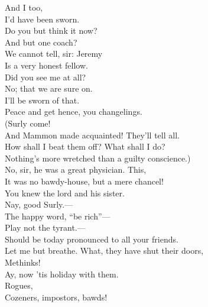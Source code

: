 \documentclass[a4paper,oneside,12pt]{memoir}
\begin{document}
\begin{drama*}
\neightwospeaks {} And I too,\\
I'd have been sworn.\\
\lovewitspeaks {} Do you but think it now?\\
And but one coach?\\
\neighthreespeaks {} We cannot tell, sir: Jeremy\\
Is a very honest fellow.\\
\facespeaks {} Did you see me at all?\\
\neighonespeaks No; that we are sure on.\\
\neightwospeaks {} I'll be sworn of that.\\
\lovewitspeaks Peace and get hence, you changelings.\\
\facespeaks {} (Surly come!\\
And Mammon made acquainted! They'll tell all.\\
How shall I beat them off? What shall I do?\\
Nothing's more wretched than a guilty conscience.)\\
\surlyspeaks No, sir, he was a great physician. This,\\
It was no bawdy-house, but a mere chancel!\\
You knew the lord and his sister.\\
\mammonspeaks {} Nay, good Surly.---\\
\surlyspeaks The happy word, ``be rich''---\\
\mammonspeaks {} Play not the tyrant.---\\
\surlyspeaks Should be today pronounced to all your friends.\\
\mammonspeaks Let me but breathe. What, they have shut their doors,\\
Methinks!\\
\surlyspeaks {} Ay, now 'tis holiday with them.\\
\mammonspeaks Rogues,\\
 Cozeners, impostors, bawds!\\

\end{drama*}
\end{document}
